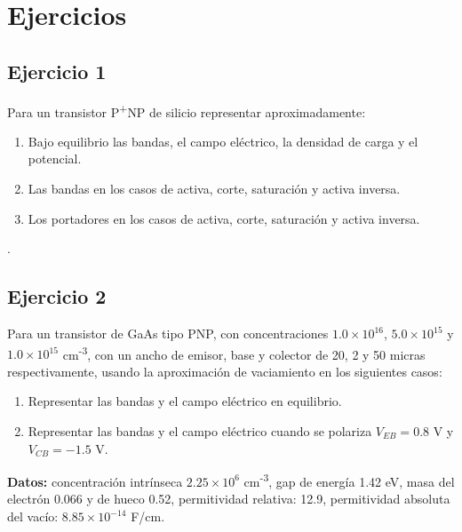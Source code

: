 

\section*{Ejercicios}



\begin{Enunciado}
\subsection*{Ejercicio 1} 

Para un transistor P\textsuperscript{+}NP de silicio representar aproximadamente:
\begin{enumerate}[label=\alph*)]
    \item Bajo equilibrio las bandas, el campo eléctrico, la densidad de carga y el potencial.
    \item Las bandas en los casos de activa, corte, saturación y activa inversa.
    \item Los portadores en los casos de activa, corte, saturación y activa inversa.
\end{enumerate}
\end{Enunciado}

\vspace*{1em}

\lipsum[1].

\vspace*{2em}



\begin{Enunciado}
\subsection*{Ejercicio 2} 

Para un transistor de GaAs tipo PNP, con concentraciones $1.0 \times 10^{16}$, $5.0 \times 10^{15}$ y $1.0 \times 10^{15}$ cm\textsuperscript{-3}, con un ancho de emisor, base y colector de 20, 2 y 50 micras respectivamente, usando la aproximación de vaciamiento en los siguientes casos:
    \begin{enumerate}[label=\alph*)]
        \item Representar las bandas y el campo eléctrico en equilibrio.
        \item Representar las bandas y el campo eléctrico cuando se polariza $V_{EB} = 0.8$ V y $V_{CB} = -1.5$ V.
    \end{enumerate}
\textbf{Datos:} concentración intrínseca $2.25 \times 10^6$ cm\textsuperscript{-3}, gap de energía 1.42 eV, masa del electrón 0.066 y de hueco 0.52, permitividad relativa: 12.9, permitividad absoluta del vacío: $8.85 \times 10^{-14}$ F/cm.
\end{Enunciado}

